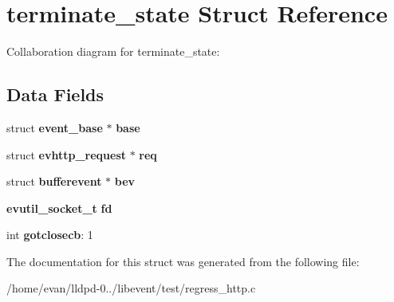 \section{terminate\-\_\-state \-Struct \-Reference}
\label{structterminate__state}


\-Collaboration diagram for terminate\-\_\-state\-:
\subsection*{\-Data \-Fields}
\begin{DoxyCompactItemize}
\item 
struct {\bf event\-\_\-base} $\ast$ {\bfseries base}\label{structterminate__state_ab1a154f7530a81e9dd1d63fc6b98a5c7}

\item 
struct {\bf evhttp\-\_\-request} $\ast$ {\bfseries req}\label{structterminate__state_a27a6cc58bd947852de09feaa5a40f768}

\item 
struct {\bf bufferevent} $\ast$ {\bfseries bev}\label{structterminate__state_a7a6bf7d3dd8ad7622482a90042e470ef}

\item 
{\bf evutil\-\_\-socket\-\_\-t} {\bfseries fd}\label{structterminate__state_adf76ebacdedde5572e9ba938beab2afe}

\item 
int {\bfseries gotclosecb}\-: 1\label{structterminate__state_a5ec05b46de955c9bc2b330a9cba184f9}

\end{DoxyCompactItemize}


\-The documentation for this struct was generated from the following file\-:\begin{DoxyCompactItemize}
\item 
/home/evan/lldpd-\/0../libevent/test/regress\-\_\-http.\-c\end{DoxyCompactItemize}
